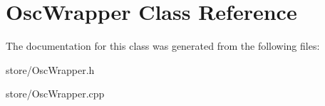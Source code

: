 \hypertarget{classOscWrapper}{}\section{Osc\+Wrapper Class Reference}
\label{classOscWrapper}


The documentation for this class was generated from the following files\+:\begin{DoxyCompactItemize}
\item 
store/Osc\+Wrapper.\+h\item 
store/Osc\+Wrapper.\+cpp\end{DoxyCompactItemize}
